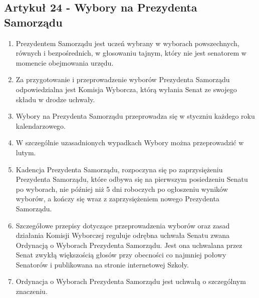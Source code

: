 \documentclass[14pt]{article}
\newenvironment{ustepy}{%
	\begin{enumerate}[leftmargin=1.5em, itemindent=1pt, labelwidth=1em, itemsep=5pt]
	}{%
	\end{enumerate}
}
\begin{document}
\subsection*{Artykuł 24 - Wybory na Prezydenta Samorządu}
\begin{ustepy}
	\item Prezydentem Samorządu jest uczeń wybrany w wyborach powszechnych, równych i bezpośrednich, w głosowaniu tajnym, który nie jest senatorem w momencie obejmowania urzędu.
	\item Za przygotowanie i przeprowadzenie wyborów Prezydenta Samorządu odpowiedzialna jest Komisja Wyborcza, którą wyłania Senat ze swojego składu w drodze uchwały.
	\item Wybory na Prezydenta Samorządu przeprowadza się w styczniu każdego roku kalendarzowego.
	\item W szczególnie uzasadnionych wypadkach Wybory można przeprowadzić w lutym.
	\item Kadencja Prezydenta Samorządu, rozpoczyna się po zaprzysiężeniu Prezydenta Samorządu, które odbywa się na pierwszym posiedzeniu Senatu po wyborach, nie później niż 5 dni roboczych po ogłoszeniu wyników wyborów, a kończy się wraz z zaprzysiężeniem nowego Prezydenta Samorządu.
	\item Szczegółowe przepisy dotyczące przeprowadzenia wyborów oraz zasad działania Komisji Wyborczej reguluje odrębna uchwała Senatu zwana Ordynacją o Wyborach Prezydenta Samorządu. Jest ona uchwalana przez Senat zwykłą większością głosów przy obecności co najmniej połowy Senatorów i publikowana na stronie internetowej Szkoły.
	\item Ordynacja o Wyborach Prezydenta Samorządu jest uchwałą o szczególnym znaczeniu.
\end{ustepy}
\newpage
\end{document}
